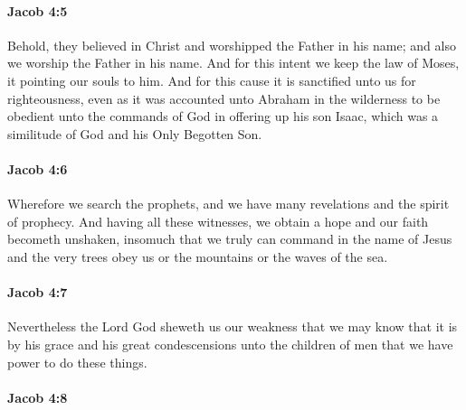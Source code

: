 		\paragraph{Jacob 4:5} %
			\label{JACOB-4-5}

			Behold, they believed in Christ and worshipped the Father in his name;
			and also we worship the Father in his name.
			And for this intent we keep the law of Moses,
			it pointing our souls to him.
			And for this cause it is sanctified unto us for righteousness,
			even as it was accounted unto Abraham in the wilderness to be obedient
			unto the commands of God in offering up his son Isaac,
			which was a similitude of God and his Only Begotten Son.

		\paragraph{Jacob 4:6} %
			\label{JACOB-4-6}

			Wherefore we search the prophets,
			and we have many revelations and the spirit of prophecy.
			And having all these witnesses,
			we obtain a hope and our faith becometh unshaken,
			insomuch that we truly can command in the name of Jesus
			and the very trees obey us or the mountains or the waves of the sea.

		\paragraph{Jacob 4:7} %
			\label{JACOB-4-7}

			Nevertheless the Lord God sheweth us our weakness that we may know
			that it is by his grace and his great condescensions unto the children of men
			that we have power to do these things.

		\paragraph{Jacob 4:8} %
			\label{JACOB-4-8}

